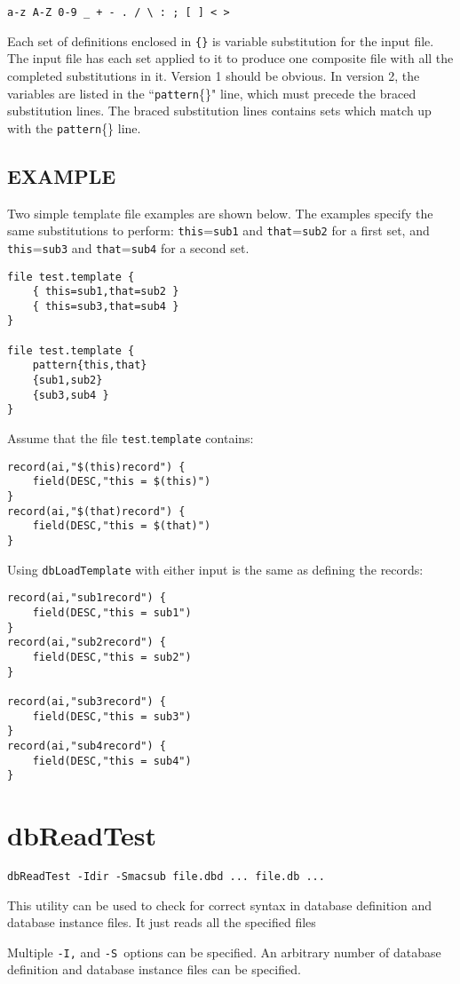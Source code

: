 \begin{verbatim}a-z A-Z 0-9 _ + - . / \ : ; [ ] < >
\end{verbatim}Each set of definitions enclosed in \verb|{}| is variable substitution for the input file. The input file has each set applied to it to 
produce one composite file with all the completed substitutions in it. Version 1 should be obvious. In version 2, the 
variables are listed in the ``\verb|pattern|\{\}" line, which must precede the braced substitution lines. The braced substitution 
lines contains sets which match up with the \verb|pattern|\{\} line.

\subsection{EXAMPLE}

Two simple template file examples are shown below. The examples specify the same substitutions to perform: 
\verb|this|=\verb|sub1| and \verb|that|=\verb|sub2| for a first set, and \verb|this|=\verb|sub3| and \verb|that|=\verb|sub4| for a second set. 

\begin{verbatim}
file test.template {
    { this=sub1,that=sub2 }
    { this=sub3,that=sub4 }
}

file test.template {
    pattern{this,that}
    {sub1,sub2}
    {sub3,sub4 }
}
\end{verbatim}Assume that the file \verb|test|.\verb|template| contains:

\begin{verbatim}
record(ai,"$(this)record") {
    field(DESC,"this = $(this)")
}
record(ai,"$(that)record") {
    field(DESC,"this = $(that)")
}
\end{verbatim}

Using \verb|dbLoadTemplate| with either input is the same as defining the records:

\begin{verbatim}record(ai,"sub1record") {
    field(DESC,"this = sub1")
}
record(ai,"sub2record") {
    field(DESC,"this = sub2")
}

record(ai,"sub3record") {
    field(DESC,"this = sub3")
}
record(ai,"sub4record") {
    field(DESC,"this = sub4")
}
\end{verbatim}\section{dbReadTest}

\begin{verbatim}dbReadTest -Idir -Smacsub file.dbd ... file.db ...
\end{verbatim}This utility can be used to check for correct syntax in database definition and database instance files. It just reads all the 
specified files

Multiple \verb|-I,| and \verb|-S |options can be specified. An arbitrary number of database definition and database instance files can 
be specified.








